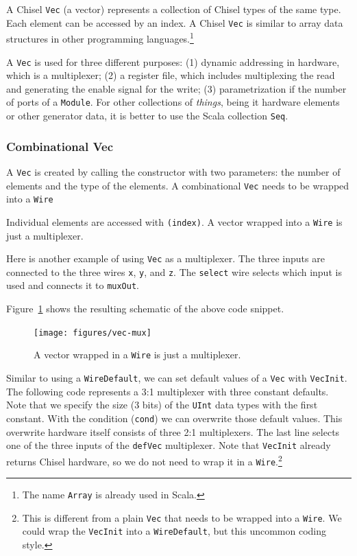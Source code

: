 \documentclass[%
    10pt,
    headinclude, footexclude,
    openright, %
    notitlepage,
    cleardoubleempty,
    headsepline,
    pointlessnumbers,
    bibtotoc, idxtotoc,
    ]{scrbook}
\newcommand{\code}[1]{{\small{\texttt{#1}}}}
\newcommand{\codefoot}[1]{{\footnotesize{\texttt{#1}}}}
\begin{document}
A Chisel \code{Vec} (a vector) represents a collection of Chisel types of the same type.
Each element can be accessed by an index. A Chisel \code{Vec} is similar
to array data structures in other programming languages.\footnote{The name \codefoot{Array}
is already used in Scala.}

A \code{Vec} is used for three different purposes: (1) dynamic addressing in hardware,
which is a multiplexer; (2) a register file, which includes multiplexing the read and
generating the enable signal for the write; (3) parametrization if the number of
ports of a \code{Module}. For other collections of \emph{things}, being it hardware elements
or other generator data, it is better to use the Scala collection \code{Seq}.

\subsubsection{Combinational Vec}


A \code{Vec} is created by calling the constructor with two parameters: the
number of elements and the type of the elements. A combinational \code{Vec}
needs to be wrapped into a \code{Wire}


\noindent Individual elements are accessed with \code{(index)}.
A vector wrapped into a \code{Wire} is just a multiplexer.


Here is another example of using \code{Vec} as a multiplexer.
The three inputs are connected to the three wires \code{x}, \code{y},
and \code{z}. The \code{select} wire selects which input is used and
connects it to \code{muxOut}.


\noindent Figure~\ref{fig:vec-mux} shows the resulting schematic of the above code snippet.

\begin{figure}
  \centering
  \texttt{[image: figures/vec-mux]}
  \caption{A vector wrapped in a \code{Wire} is just a multiplexer.}
  \label{fig:vec-mux}
\end{figure}

Similar to using a \code{WireDefault}, we can set default values of a \code{Vec} with \code{VecInit}.
The following code represents a 3:1 multiplexer with three constant defaults. Note that we specify
the size (3 bits) of the \code{UInt} data types with the first constant.
With the condition (\code{cond}) we can overwrite those default values.
This overwrite hardware itself consists of three 2:1 multiplexers. The last line selects
one of the three inputs of the \code{defVec} multiplexer. Note that \code{VecInit} already returns
Chisel hardware, so we do not need to wrap it in a \code{Wire}.\footnote{This is different from
a plain \codefoot{Vec} that needs to be wrapped into a \codefoot{Wire}. We could wrap the \codefoot{VecInit}
into a \codefoot{WireDefault}, but this uncommon coding style.}
\end{document}
